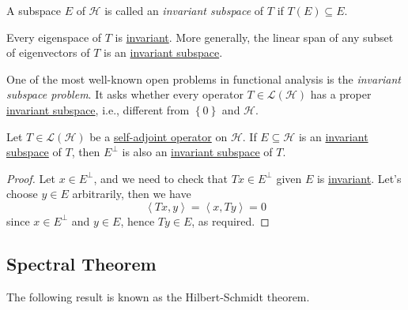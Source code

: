 \begin{definition}\label{def:invariant-subspace}
	A subspace \(E\) of \(\mathcal{H} \) is called an \emph{invariant subspace} of \(T\) if \(T(E) \subseteq E\).
\end{definition}

\begin{eg}
	Every eigenspace of \(T\) is \hyperref[def:invariant-subspace]{invariant}. More generally, the linear span of any subset of eigenvectors of \(T\) is an \hyperref[def:invariant-subspace]{invariant subspace}.
\end{eg}

One of the most well-known open problems in functional analysis is the \emph{invariant subspace problem}. It asks whether every operator \(T\in \mathcal{L} (\mathcal{H} )\) has a proper \hyperref[def:invariant-subspace]{invariant subspace}, i.e., different from \(\left\{ 0 \right\} \) and \(\mathcal{H} \).

\begin{proposition}\label{prop:lec23}
	Let \(T\in \mathcal{L} (\mathcal{H} )\) be a \hyperref[def:self-adjoint-op]{self-adjoint operator} on \(\mathcal{H} \). If \(E \subseteq \mathcal{H} \) is an \hyperref[def:invariant-subspace]{invariant subspace} of \(T\), then \(E^{\perp} \) is also an \hyperref[def:invariant-subspace]{invariant subspace} of \(T\).
\end{proposition}
\begin{proof}
	Let \(x\in E^{\perp} \), and we need to check that \(Tx \in E ^{\perp} \) given \(E\) is \hyperref[def:invariant-subspace]{invariant}. Let's choose \(y\in E\) arbitrarily, then we have
	\[
		\left\langle Tx , y \right\rangle = \left\langle x, Ty \right\rangle = 0
	\]
	since \(x\in E^{\perp} \) and \(y\in E\), hence \(Ty\in E\), as required.
\end{proof}

\subsection{Spectral Theorem}
The following result is known as the Hilbert-Schmidt theorem.

